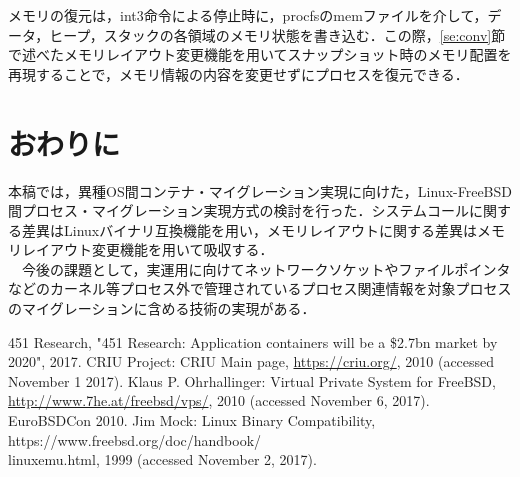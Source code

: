 \documentclass{ipsjpapers}
\begin{document}
メモリの復元は，int3命令による停止時に，procfsのmemファイルを介して，データ，ヒープ，スタックの各領域のメモリ状態を書き込む．この際，\ref{se:conv}節で述べたメモリレイアウト変更機能を用いてスナップショット時のメモリ配置を再現することで，メモリ情報の内容を変更せずにプロセスを復元できる．
\section{おわりに}
本稿では，異種OS間コンテナ・マイグレーション実現に向けた，Linux-FreeBSD間プロセス・マイグレーション実現方式の検討を行った．システムコールに関する差異はLinuxバイナリ互換機能を用い，メモリレイアウトに関する差異はメモリレイアウト変更機能を用いて吸収する．\\
　今後の課題として，実運用に向けてネットワークソケットやファイルポインタなどのカーネル等プロセス外で管理されているプロセス関連情報を対象プロセスのマイグレーションに含める技術の実現がある．
\begin{thebibliography}{99}
  	451 Research, "451 Research: Application containers will be a \$2.7bn market by 2020", 2017.
  	CRIU Project: CRIU Main page, \url{https://criu.org/}, 2010 (accessed November 1 2017).
  Klaus P. Ohrhallinger: Virtual Private System for FreeBSD, \url{http://www.7he.at/freebsd/vps/}, 2010 (accessed November 6, 2017). EuroBSDCon 2010.
  Jim Mock: Linux Binary Compatibility, https://www.freebsd.org\slash{}doc\slash{}handbook\slash{}\\linuxemu.html, 1999 (accessed November 2, 2017).
\end{thebibliography}
\end{document}
